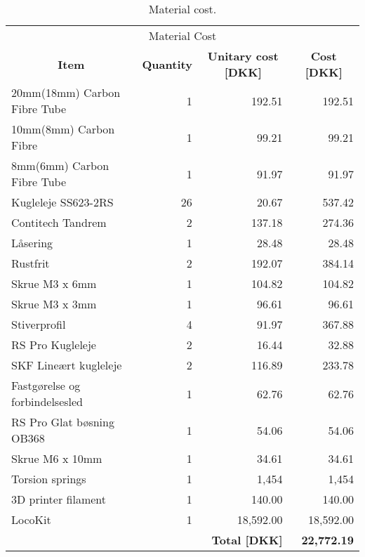 \begin{table}[H]
\caption{Material cost.}
\centering
\begin{tabular}{l|r|r|r}
\multicolumn{4}{c}{\Large Material Cost} \\
\multicolumn{1}{c|}{\textbf{Item}} & \multicolumn{1}{c|}{\textbf{Quantity}} & \multicolumn{1}{c|}{\textbf{Unitary cost [DKK]}} & \multicolumn{1}{c}{\textbf{Cost [DKK]}} \\ \hline
20mm(18mm) Carbon Fibre Tube & 1 & 192.51 & 192.51 \\ \hline
10mm(8mm) Carbon Fibre & 1 & 99.21 & 99.21 \\ \hline
8mm(6mm) Carbon Fibre Tube & 1 & 91.97 & 91.97 \\ \hline
Kugleleje SS623-2RS & 26 & 20.67 & 537.42 \\ \hline
Contitech Tandrem & 2 & 137.18 & 274.36 \\ \hline
Låsering & 1 & 28.48 & 28.48 \\ \hline
Rustfrit & 2 & 192.07 & 384.14 \\ \hline
Skrue M3 x 6mm & 1 & 104.82 & 104.82 \\ \hline
Skrue M3 x 3mm & 1 & 96.61 & 96.61 \\ \hline
Stiverprofil & 4 & 91.97 & 367.88 \\ \hline
RS Pro Kugleleje & 2 & 16.44 & 32.88 \\ \hline
SKF Lineært kugleleje & 2 & 116.89 & 233.78 \\ \hline
Fastgørelse og forbindelsesled & 1 & 62.76 & 62.76 \\ \hline
RS Pro Glat bøsning OB368 & 1 & 54.06 & 54.06 \\ \hline
Skrue M6 x 10mm & 1 & 34.61 & 34.61 \\ \hline
Torsion springs & 1 & 1,454 & 1,454 \\ \hline
3D printer filament & 1 & 140.00 & 140.00 \\ \hline
LocoKit  & 1 & 18,592.00 & 18,592.00 \\ \hline
\multicolumn{2}{l}{} & \textbf{Total [DKK]} & \textbf{22,772.19} \\
\end{tabular}
\label{tab:material_cost}
\end{table}


